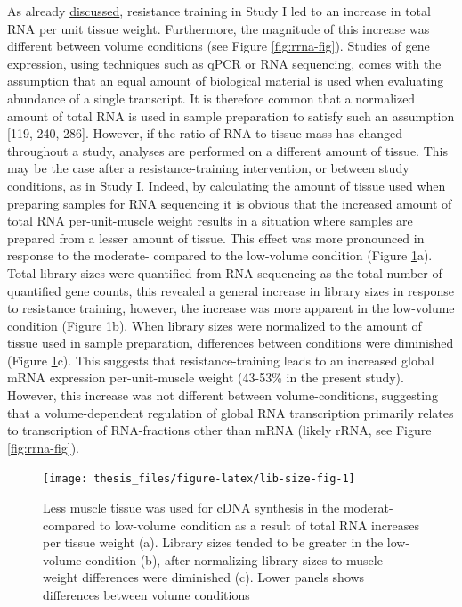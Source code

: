 \documentclass[twoside,10pt]{gihclass} %
\begin{document}
As already \protect\hyperlink{muscle-mass-growth}{discussed}, resistance training in Study I led to an increase in total RNA per unit tissue weight. Furthermore, the magnitude of this increase was different between volume conditions (see Figure \ref{fig:rrna-fig}).
Studies of gene expression, using techniques such as qPCR or RNA sequencing, comes with the assumption that an equal amount of biological material is used when evaluating abundance of a single transcript.
It is therefore common that a normalized amount of total RNA is used in sample preparation to satisfy such an assumption
{[}119, 240, 286{]}.
However, if the ratio of RNA to tissue mass has changed throughout a study, analyses are performed on a different amount of tissue. This may be the case after a resistance-training intervention, or between study conditions, as in Study I.
Indeed, by calculating the amount of tissue used when preparing samples for RNA sequencing it is obvious that the increased amount of total RNA per-unit-muscle weight results in a situation where samples are prepared from a lesser amount of tissue.
This effect was more pronounced in response to the moderate- compared to the low-volume condition (Figure \ref{fig:lib-size-fig}a).
Total library sizes were quantified from RNA sequencing as the total number of quantified gene counts, this revealed a general increase in library sizes in response to resistance training, however, the increase was more apparent in the low-volume condition
(Figure \ref{fig:lib-size-fig}b).
When library sizes were normalized to the amount of tissue used in sample preparation, differences between conditions were diminished
(Figure \ref{fig:lib-size-fig}c).
This suggests that resistance-training leads to an increased global mRNA expression per-unit-muscle weight (43-53\% in the present study). However, this increase was not different between volume-conditions, suggesting that a volume-dependent regulation of global RNA transcription primarily relates to transcription of RNA-fractions other than mRNA (likely rRNA, see Figure \ref{fig:rrna-fig}).
\begin{figure}

{\centering \texttt{[image: thesis\_files/figure-latex/lib-size-fig-1]} 

}

\caption[Muscle weight and RNA-seq library size]{Less muscle tissue was used for cDNA synthesis in the moderat- compared to low-volume condition as a result of total RNA increases per tissue weight (a). Library sizes tended to be greater in the low-volume condition (b), after normalizing library sizes to muscle weight differences were diminished (c). Lower panels shows differences between volume conditions}\label{fig:lib-size-fig}
\end{figure}
\end{document}
